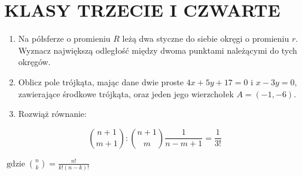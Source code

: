\documentclass[10pt]{article}
\begin{document}
\section*{KLASY TRZECIE I CZWARTE}
\begin{enumerate}
  \item Na półsferze o promieniu \(R\) leżą dwa styczne do siebie okręgi o promieniu \(r\). Wyznacz największą odległość między dwoma punktami należącymi do tych okręgów.
  \item Oblicz pole trójkąta, mając dane dwie proste \(4 x+5 y+17=0\) i \(x-3 y=0\), zawierające środkowe trójkąta, oraz jeden jego wierzchołek \(A=(-1,-6)\).
  \item Rozwiąż równanie:
\end{enumerate}

\[
\binom{n+1}{m+1}:\binom{n+1}{m} \frac{1}{n-m+1}=\frac{1}{3!}
\]

\(\operatorname{gdzie}\binom{n}{k}=\frac{n!}{k!(n-k)!}\)
\end{document}
